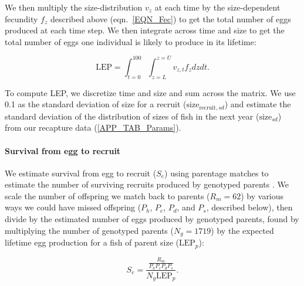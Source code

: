 \documentclass[12pt, oneside]{article}   	%
\begin{document}
We then multiply the size-distribution $v_z$ at each time by the size-dependent fecundity $f_z$ described above (eqn.\ \ref{EQN_Fec}) to get the total number of eggs produced at each time step. We then integrate across time and size to get the total number of eggs one individual is likely to produce in its lifetime:

\begin{equation}
\text{LEP} = \int_{t=0}^{100}\int_{z=L}^{z=U} v_{z,t} f_z dz dt. \label{EQN_LEP}
\end{equation}

To compute LEP, we discretize time and size and sum across the matrix. We use 0.1 as the standard deviation of size for a recruit ($\text{size}_{\text{recruit}, sd}$) and estimate the standard deviation of the distribution of sizes of fish in the next year ($\text{size}_{sd}$) from our recapture data (\ref{APP_TAB_Params}).


\paragraph*{Survival from egg to recruit}

We estimate survival from egg to recruit ($S_e$) using parentage matches to estimate the number of surviving recruits produced by genotyped parents \citep[similar to the method in][]{johnson2018integrating}. We scale the number of offspring we match back to parents ($R_m = 62$) by various ways we could have missed offspring ($P_h$, $P_c$, $P_d$, and $P_s$, described below), then divide by the estimated number of eggs produced by genotyped parents, found by multiplying the number of genotyped parents ($N_g = 1719$) by the expected lifetime egg production for a fish of parent size ($\text{LEP}_p$):

\begin{equation}
S_e = \frac{\frac{R_m}{P_h P_c P_d P_s}}{N_g \text{LEP}_p}. \label{EQN_EggRecruitSurv}
\end{equation}
\end{document}
